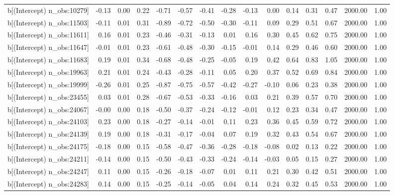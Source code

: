 \begin{table}[ht]
\begin{tabular}{rrrrrrrrrrrrrrr}
  b[(Intercept) n\_obs:10279] & -0.13 & 0.00 & 0.22 & -0.71 & -0.57 & -0.41 & -0.28 & -0.13 & 0.00 & 0.14 & 0.31 & 0.47 & 2000.00 & 1.00 \\ 
  b[(Intercept) n\_obs:11503] & -0.11 & 0.01 & 0.31 & -0.89 & -0.72 & -0.50 & -0.30 & -0.11 & 0.09 & 0.29 & 0.51 & 0.67 & 2000.00 & 1.00 \\ 
  b[(Intercept) n\_obs:11611] & 0.16 & 0.01 & 0.23 & -0.46 & -0.31 & -0.13 & 0.01 & 0.16 & 0.30 & 0.45 & 0.62 & 0.75 & 2000.00 & 1.00 \\ 
  b[(Intercept) n\_obs:11647] & -0.01 & 0.01 & 0.23 & -0.61 & -0.48 & -0.30 & -0.15 & -0.01 & 0.14 & 0.29 & 0.46 & 0.60 & 2000.00 & 1.00 \\ 
  b[(Intercept) n\_obs:11683] & 0.19 & 0.01 & 0.34 & -0.68 & -0.48 & -0.25 & -0.05 & 0.19 & 0.42 & 0.64 & 0.83 & 1.05 & 2000.00 & 1.00 \\ 
  b[(Intercept) n\_obs:19963] & 0.21 & 0.01 & 0.24 & -0.43 & -0.28 & -0.11 & 0.05 & 0.20 & 0.37 & 0.52 & 0.69 & 0.84 & 2000.00 & 1.00 \\ 
  b[(Intercept) n\_obs:19999] & -0.26 & 0.01 & 0.25 & -0.87 & -0.75 & -0.57 & -0.42 & -0.27 & -0.10 & 0.06 & 0.23 & 0.38 & 2000.00 & 1.00 \\ 
  b[(Intercept) n\_obs:23455] & 0.03 & 0.01 & 0.28 & -0.67 & -0.53 & -0.33 & -0.16 & 0.03 & 0.21 & 0.39 & 0.57 & 0.70 & 2000.00 & 1.00 \\ 
  b[(Intercept) n\_obs:24067] & -0.00 & 0.00 & 0.18 & -0.50 & -0.37 & -0.24 & -0.12 & -0.01 & 0.12 & 0.23 & 0.34 & 0.47 & 2000.00 & 1.00 \\ 
  b[(Intercept) n\_obs:24103] & 0.23 & 0.00 & 0.18 & -0.27 & -0.14 & -0.01 & 0.11 & 0.23 & 0.36 & 0.45 & 0.59 & 0.72 & 2000.00 & 1.00 \\ 
  b[(Intercept) n\_obs:24139] & 0.19 & 0.00 & 0.18 & -0.31 & -0.17 & -0.04 & 0.07 & 0.19 & 0.32 & 0.43 & 0.54 & 0.67 & 2000.00 & 1.00 \\ 
  b[(Intercept) n\_obs:24175] & -0.18 & 0.00 & 0.15 & -0.58 & -0.47 & -0.36 & -0.28 & -0.18 & -0.08 & 0.02 & 0.13 & 0.22 & 2000.00 & 1.00 \\ 
  b[(Intercept) n\_obs:24211] & -0.14 & 0.00 & 0.15 & -0.50 & -0.43 & -0.33 & -0.24 & -0.14 & -0.03 & 0.05 & 0.15 & 0.27 & 2000.00 & 1.00 \\ 
  b[(Intercept) n\_obs:24247] & 0.11 & 0.00 & 0.15 & -0.26 & -0.18 & -0.07 & 0.01 & 0.11 & 0.21 & 0.30 & 0.42 & 0.51 & 2000.00 & 1.00 \\ 
  b[(Intercept) n\_obs:24283] & 0.14 & 0.00 & 0.15 & -0.25 & -0.14 & -0.05 & 0.04 & 0.14 & 0.24 & 0.32 & 0.45 & 0.53 & 2000.00 & 1.00 \\ 

\end{tabular}
\end{table}
